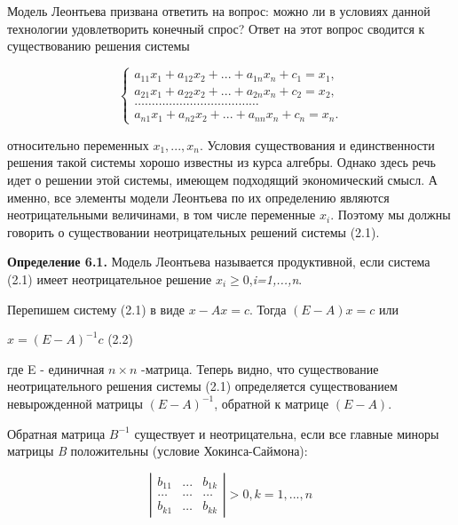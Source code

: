 \documentclass[12pt, 4paper]{book}
\begin{document}
{Модель Леонтьева призвана ответить на вопрос: можно ли в условиях данной технологии удовлетворить конечный спрос? Ответ на этот вопрос сводится к существованию решения системы
\begin{center}
$$\left\{
\begin{aligned}
a_{11}x_{1}+ a_{12}x_{2} + ... + a_{1n}x_{n} + c_1 = x_1,\\
a_{21}x_{1}+ a_{22}x_{2} + ... + a_{2n}x_{n} + c_2 = x_2,\\
\ldots\ldots\ldots\ldots\ldots\ldots\ldots\ldots\ldots\ldots\ldots\ldots\\
a_{n1}x_{1}+ a_{n2}x_{2} + ... + a_{nn}x_{n} + c_n = x_n.
\end{aligned}
\right.$$
\end{center}
относительно переменных $x_1,...,x_n$. Условия существования и единственности решения такой системы хорошо известны из курса алгебры. Однако здесь речь идет о решении этой системы, имеющем подходящий экономический смысл. А именно, все элементы модели Леонтьева по их определению являются неотрицательными величинами, в том числе переменные $x_i$. Поэтому мы должны говорить о существовании неотрицательных решений системы (2.1).
\par

\textbf{Определение 6.1.} Модель Леонтьева называется продуктивной, если система (2.1) имеет неотрицательное решение $x_i \geq 0$,\textit{i=1,...,n}. 
\par

Перепишем систему (2.1) в виде $x-Ax=c$. Тогда $(E-A)x=c$ или
\begin{center}
$x=(E-A)^{-1}c$ (2.2)
\end{center}
где E - единичная $n \times n$ -матрица. Теперь видно, что существование неотрицательного решения системы (2.1) определяется существованием невырожденной матрицы $(E-A)^{-1}$, обратной к матрице $(E-A)$.
\par

Обратная матрица $B^{-1}$ существует и неотрицательна, если все главные миноры матрицы \textit{B} положительны (условие Хокинса-Саймона):
\begin{center}
\begin{displaymath}
\left| \begin{array}{cccc}
b_{11} & ... & b_{1k}\\
\ldots & \ldots & \ldots \\
b_{k1} & \ldots & b_{kk}
\end{array} \right|>0 ,k=1,...,n
\end{displaymath}
\end{center}
\par

}
\end{document}
